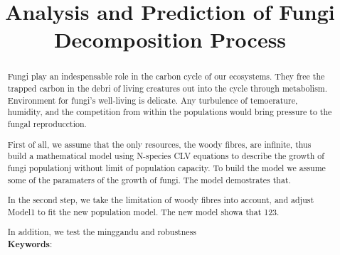 \documentclass[12pt]{article}
\title{Analysis and Prediction of Fungi Decomposition Process}
\begin{document}
	\begin{abstract}
		Fungi play an indespensable role in the carbon cycle of our ecosystems. They free the trapped carbon in the debri of living creatures out into the cycle through metabolism. Environment for fungi's well-living is delicate. Any turbulence of temoerature, humidity, and the competition from within the populations would bring pressure to the fungal reproducction.
		
		First of all, we assume that the only resources, the woody fibres, are infinite, thus build a mathematical model using N-species CLV equations to describe the growth of fungi populationj without limit of population capacity. To build the model we assume some of the paramaters of the growth of fungi. The model demostrates that.
		
		In the second step, we take the limitation of woody fibres into account, and adjust Model1 to fit the new population model. The new model showa that 123.

		
		
		In addition, we test the minggandu and robustness\\
		\vspace{5pt}
		\textbf{Keywords}:
	\end{abstract}
	
	\maketitle
	\tableofcontents
	
	
	
	
	
	
	
	
	
\end{document}
